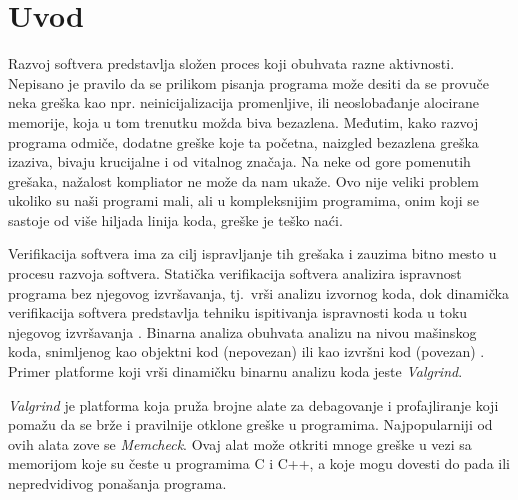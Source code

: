 \documentclass[12pt,oneside]{memoir}
\theoremstyle{plain}
\theoremstyle{definition}
\begin{document}
\frontmatter
\naslovna
\komisija
\apstrakt
\tableofcontents*

\mainmatter

\chapter{Uvod}
Razvoj softvera predstavlja složen proces koji obuhvata razne aktivnosti. Nepisano je pravilo da se prilikom pisanja programa može desiti da se provuče neka greška kao npr. neinicijalizacija promenljive, ili neoslobađanje alocirane memorije, koja u tom trenutku možda biva bezazlena. Međutim, kako razvoj programa odmiče, dodatne greške koje ta početna, naizgled bezazlena greška izaziva, bivaju krucijalne i od vitalnog značaja. Na neke od gore pomenutih grešaka, nažalost kompliator ne može da nam ukaže. Ovo nije veliki problem ukoliko su naši programi mali, ali u  kompleksnijim programima, onim koji se sastoje od više hiljada linija koda, greške je teško naći. 

Verifikacija softvera ima za cilj ispravljanje tih grešaka i zauzima bitno mesto u procesu razvoja softvera. Statička verifikacija softvera analizira ispravnost programa bez njegovog izvršavanja, tj.~vrši analizu izvornog koda, dok dinamička verifikacija softvera predstavlja tehniku ispitivanja ispravnosti koda u toku njegovog izvršavanja \cite{02Motivacija}. Binarna analiza obuhvata analizu na nivou mašinskog koda, snimljenog kao objektni kod (nepovezan) ili kao izvršni kod (povezan) \cite{03DinamickaAnaliza}. Primer platforme koji vrši dinamičku binarnu analizu koda jeste \textit{Valgrind}.  

\textit{Valgrind} je platforma koja pruža brojne alate za debagovanje i profajliranje koji pomažu da se brže i pravilnije otklone greške u programima. Najpopularniji od ovih alata zove se \textit{Memcheck}. Ovaj alat može otkriti mnoge greške u vezi sa memorijom koje su česte u programima C i C++, a koje mogu dovesti do pada ili nepredvidivog ponašanja programa. 
\end{document}
